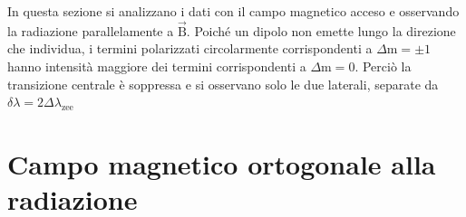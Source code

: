 \documentclass[twocolumn,10pt]{asme2ej}
\begin{document}

In questa sezione si analizzano i dati con il campo magnetico acceso e osservando la radiazione parallelamente a
$\vec{\text{B}}$. Poiché un dipolo non emette lungo la direzione che individua, i termini polarizzati circolarmente
corrispondenti a $\Delta \text{m} = \pm 1$ hanno intensità maggiore dei termini corrispondenti a $\Delta \text{m} = 0$.
Perciò la transizione centrale è soppressa e si osservano solo le due laterali, separate da $\delta\lambda = 2
\Delta\lambda_{\text{zee}}$
 







\section{Campo magnetico ortogonale alla radiazione}\label{s:ortogonale}

\end{document}
